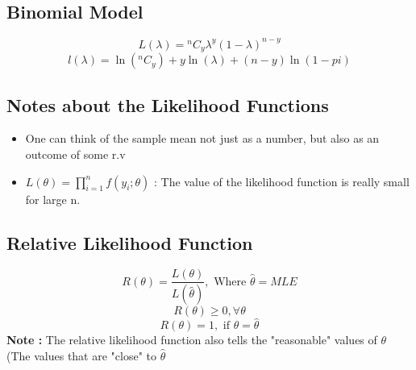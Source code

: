 \documentclass{article}
\begin{document}
\subsection*{Binomial Model}
$$L(\lambda) = {}^nC_y \lambda^y (1-\lambda)^{n - y}  $$
$$l(\lambda) = \ln({}^nC_y) + y \ln (\lambda) + (n-y) \ln ( 1- pi) $$

\subsection*{Notes about the Likelihood Functions}
\begin{itemize}
\item One can think of the sample mean not just as a number, but also as an outcome of some r.v
\item \(L(\theta) = \prod_{i = 1}^n f(y_i ;\theta) \) : The value of the likelihood function is really small for large n. 
\end{itemize}

\subsection{Relative Likelihood Function}
$$R(\theta) = \frac{L(\theta)}{L(\hat{\theta})} , \text{ Where } \hat{\theta} = MLE $$ 
$$ R(\theta) \geq  0, \forall \theta $$
$$ R(\theta) = 1, \text{ if } \theta = \hat{\theta} $$
\textbf{Note : } The relative likelihood function also tells the "reasonable" values of \(\theta\) (The values that are "close" to \(\hat{\theta}\)
\end{document}
